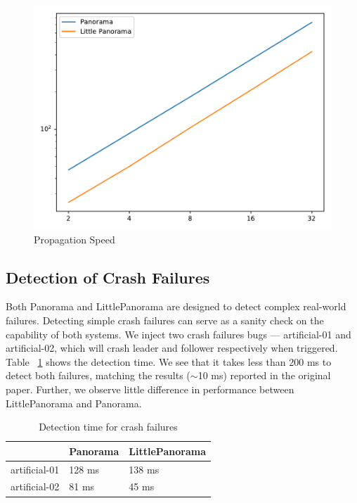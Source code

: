 \begin{figure}[!tb]
\centering
\includegraphics[scale=0.4]{figs/propagation.pdf}
\vspace{-1em}
\caption{Propagation Speed
\label{fig:propagation}
}
\end{figure}

\subsection{Detection of Crash Failures}
Both Panorama and LittlePanorama are designed to detect complex real-world failures. Detecting simple crash failures can serve as a sanity check on the capability of both systems. We inject two crash failures bugs --- artificial-01 and artificial-02, which will crash leader and follower respectively when triggered. Table ~\ref{tab:crashperf} shows the detection time. We see that it takes less than 200 ms to detect both failures, matching the results ($\sim$10 ms) reported in the original paper. Further, we observe little difference in performance between LittlePanorama and Panorama.

\begin{table}[!tb]
\begin{tabular}{p{}p{}p{}}%

\toprule
 & \textbf{Panorama} & \textbf{LittlePanorama} \\
\midrule
  artificial-01    &    128 ms  &  138 ms  \\
  artificial-02       &   81 ms   &  45 ms \\
\bottomrule
\end{tabular}
\vspace{0.5em}
\caption{Detection time for crash failures}
\label{tab:crashperf}
\end{table}

